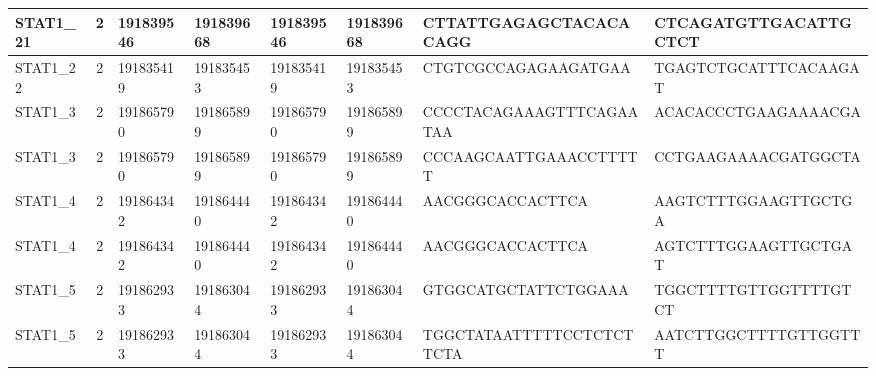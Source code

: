 \begin{landscape}
\begin{longtable}{| p{} | p{} | p{} | p{} | p{} | p{} | p{} | p{} |}
\multicolumn{1}{|l|}{STAT1\_21}  & \multicolumn{1}{c|}{2}  & \multicolumn{1}{l|}{191839546} & \multicolumn{1}{l|}{191839668} & \multicolumn{1}{l|}{191839546} & \multicolumn{1}{l|}{191839668} & \multicolumn{1}{l|}{CTTATTGAGAGCTACACACAGG}          & \multicolumn{1}{l|}{CTCAGATGTTGACATTGCTCT}         \\ \hline
\multicolumn{1}{|l|}{STAT1\_22}  & \multicolumn{1}{c|}{2}  & \multicolumn{1}{l|}{191835419} & \multicolumn{1}{l|}{191835453} & \multicolumn{1}{l|}{191835419} & \multicolumn{1}{l|}{191835453} & \multicolumn{1}{l|}{CTGTCGCCAGAGAAGATGAA}            & \multicolumn{1}{l|}{TGAGTCTGCATTTCACAAGAT}         \\ \hline
\multicolumn{1}{|l|}{STAT1\_3}   & \multicolumn{1}{c|}{2}  & \multicolumn{1}{l|}{191865790} & \multicolumn{1}{l|}{191865899} & \multicolumn{1}{l|}{191865790} & \multicolumn{1}{l|}{191865899} & \multicolumn{1}{l|}{CCCCTACAGAAAGTTTCAGAATAA}        & \multicolumn{1}{l|}{ACACACCCTGAAGAAAACGA}          \\ \hline
\multicolumn{1}{|l|}{STAT1\_3}   & \multicolumn{1}{c|}{2}  & \multicolumn{1}{l|}{191865790} & \multicolumn{1}{l|}{191865899} & \multicolumn{1}{l|}{191865790} & \multicolumn{1}{l|}{191865899} & \multicolumn{1}{l|}{CCCAAGCAATTGAAACCTTTTT}          & \multicolumn{1}{l|}{CCTGAAGAAAACGATGGCTA}          \\ \hline
\multicolumn{1}{|l|}{STAT1\_4}   & \multicolumn{1}{c|}{2}  & \multicolumn{1}{l|}{191864342} & \multicolumn{1}{l|}{191864440} & \multicolumn{1}{l|}{191864342} & \multicolumn{1}{l|}{191864440} & \multicolumn{1}{l|}{AACGGGCACCACTTCA}                & \multicolumn{1}{l|}{AAGTCTTTGGAAGTTGCTGA}          \\ \hline
\multicolumn{1}{|l|}{STAT1\_4}   & \multicolumn{1}{c|}{2}  & \multicolumn{1}{l|}{191864342} & \multicolumn{1}{l|}{191864440} & \multicolumn{1}{l|}{191864342} & \multicolumn{1}{l|}{191864440} & \multicolumn{1}{l|}{AACGGGCACCACTTCA}                & \multicolumn{1}{l|}{AGTCTTTGGAAGTTGCTGAT}          \\ \hline
\multicolumn{1}{|l|}{STAT1\_5}   & \multicolumn{1}{c|}{2}  & \multicolumn{1}{l|}{191862933} & \multicolumn{1}{l|}{191863044} & \multicolumn{1}{l|}{191862933} & \multicolumn{1}{l|}{191863044} & \multicolumn{1}{l|}{GTGGCATGCTATTCTGGAAA}            & \multicolumn{1}{l|}{TGGCTTTTGTTGGTTTTGTCT}         \\ \hline
\multicolumn{1}{|l|}{STAT1\_5}   & \multicolumn{1}{c|}{2}  & \multicolumn{1}{l|}{191862933} & \multicolumn{1}{l|}{191863044} & \multicolumn{1}{l|}{191862933} & \multicolumn{1}{l|}{191863044} & \multicolumn{1}{l|}{TGGCTATAATTTTTCCTCTCTTCTA}       & \multicolumn{1}{l|}{AATCTTGGCTTTTGTTGGTTT}         \\ \hline

\end{longtable}
\end{landscape}
